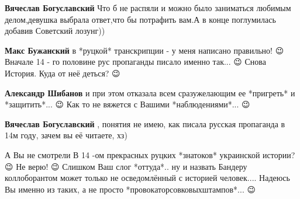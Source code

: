 \begin{itemize}
\begin{itemize}
 
\textbf{Вячеслав Богуславский} Что б не распяли и можно было заниматься любимым делом,девушка выбрала ответ,что бы потрафить вам.А в конце поглумилась добавив Советский лозунг))

 
\textbf{Макс Бужанский} в *руцкой* транскрипции - у меня написано правильно! 😉 Вначале 14 - го половине рус пропаганды писало именно так... 😉 Снова История. Куда от неё деться? 😉

 
\textbf{Александр Шибанов} и при этом отказала всем сразужелающим ее *пригреть* и *защитить*... 😉 Как то не вяжется с Вашими *наблюдениями*... 😉

 
\textbf{Вячеслав Богуславский} , понятия не имею, как писала русская пропаганда в 14м году, зачем вы её читаете, хз)

 

А Вы не смотрели В 14 -ом прекрасных руцких *знатоков* украинской истории? 😉
Не верю! 😉 Слишком Ваш слог *оттуда*.. ну и назвать Бандеру коллоборантом
может только не осведомлённый с историей человек.... Надеюсь Вы именно из
таких, а не просто *провокаторсовковыхштампов*... 😉



\end{itemize}
\end{itemize}
